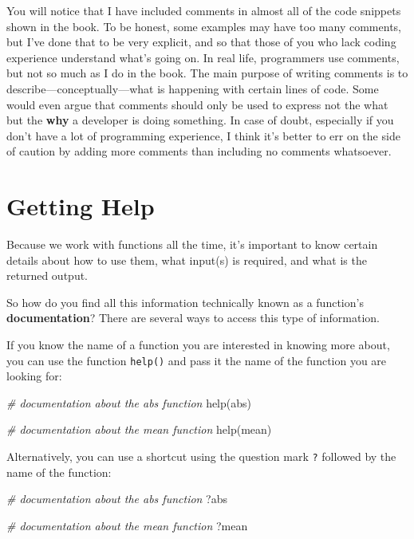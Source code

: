 \documentclass[
]{book}
\newenvironment{Shaded}{\begin{snugshade}}{\end{snugshade}}
\newcommand{\CommentTok}[1]{\textcolor[rgb]{0.56,0.35,0.01}{\textit{#1}}}
\newcommand{\FunctionTok}[1]{\textcolor[rgb]{0.00,0.00,0.00}{#1}}
\newcommand{\NormalTok}[1]{#1}
\begin{document}
You will notice that I have included comments in almost all of the code
snippets shown in the book. To be honest, some examples may have too many
comments, but I've done that to be very explicit, and so that those of you
who lack coding experience understand what's going on. In real life, programmers
use comments, but not so much as I do in the book. The main purpose of
writing comments is to describe---conceptually---what is happening with certain
lines of code. Some would even argue that comments should only be used to
express not the what but the \textbf{why} a developer is doing something. In case
of doubt, especially if you don't have a lot of programming experience, I think
it's better to err on the side of caution by adding more comments than
including no comments whatsoever.

\hypertarget{help-documentation}{%
\section{Getting Help}\label{help-documentation}}

Because we work with functions all the time, it's important to know certain
details about how to use them, what input(s) is required, and what is the
returned output.

So how do you find all this information technically known as a function's
\textbf{documentation}? There are several ways to access this type of information.

If you know the name of a function you are interested in knowing more about,
you can use the function \texttt{help()} and pass it the name of the function you
are looking for:

\begin{Shaded}
\begin{Highlighting}[]
\CommentTok{\# documentation about the \textquotesingle{}abs\textquotesingle{} function}
\FunctionTok{help}\NormalTok{(abs)}

\CommentTok{\# documentation about the \textquotesingle{}mean\textquotesingle{} function}
\FunctionTok{help}\NormalTok{(mean)}
\end{Highlighting}
\end{Shaded}

Alternatively, you can use a shortcut using the question mark \texttt{?} followed
by the name of the function:

\begin{Shaded}
\begin{Highlighting}[]
\CommentTok{\# documentation about the \textquotesingle{}abs\textquotesingle{} function}
\NormalTok{?abs}

\CommentTok{\# documentation about the \textquotesingle{}mean\textquotesingle{} function}
\NormalTok{?mean}
\end{Highlighting}
\end{Shaded}
\end{document}
